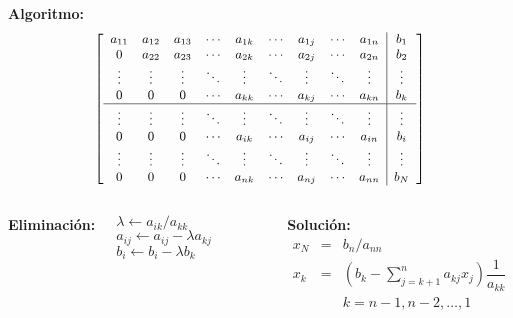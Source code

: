 \documentclass[9pt, aspectratio=169]{beamer}
\begin{document}
\begin{frame}
\textbf{Algoritmo:}
\begin{equation*} {\small
\left[ 
 \begin{array}{ccccccccc|c}
 a_{11} & a_{12} & a_{13} & \cdots & a_{1k} & \cdots & a_{1j} & \cdots & a_{1n} & b_1 \\
 0      & a_{22} & a_{23} & \cdots & a_{2k} & \cdots & a_{2j} & \cdots & a_{2n} & b_2 \\
 \vdots & \vdots & \vdots & \ddots & \vdots & \ddots & \vdots & \ddots & \vdots & \vdots \\
 0      & 0      & 0      & \cdots & a_{kk} & \cdots & a_{kj} & \cdots & a_{kn} & b_k \\
 \hline
\vdots & \vdots & \vdots & \ddots & \vdots & \ddots & \vdots & \ddots & \vdots & \vdots \\
 0      & 0      & 0      & \cdots & a_{ik} & \cdots & a_{ij} & \cdots & a_{in} & b_i \\
\vdots & \vdots & \vdots & \ddots & \vdots & \ddots & \vdots & \ddots & \vdots & \vdots \\
 0      & 0      & 0      & \cdots & a_{nk} & \cdots & a_{nj} & \cdots & a_{nn} & b_N \\
 \end{array} \right] }
\end{equation*}
\begin{columns}[t]
\column{5cm}
\textbf{Eliminación:} {\small
\begin{algorithmic}[1]
    \State $\lambda \gets a_{ik}/a_{kk}$
      \State $a_{ij} \gets a_{ij} - \lambda a_{kj}$
    \EndFor
    \State $b_i \gets b_i - \lambda b_k$
 \EndFor	
\end{algorithmic} }
\column{6cm}
\textbf{Solución:} {\small
\begin{eqnarray*}
 x_N &=& b_n / a_{nn} \\
 x_k &=& \left( b_k- \sum_{j=k+1}^n a_{kj}x_j \right)  \dfrac{1}{a_{kk}} \\
 & &k = n-1, n-2, \ldots, 1
\end{eqnarray*} }
\end{columns}
\end{frame}
\end{document}
